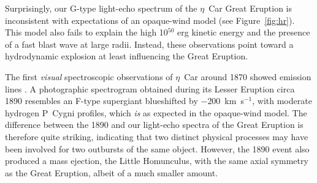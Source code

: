 Surprisingly, our G-type light-echo spectrum of the $\eta$~Car Great
Eruption is inconsistent with expectations of an opaque-wind
model\cite{Davidson87} (see Figure~\ref{fig:hr}). This model also
fails to explain the high 10$^{50}$ erg kinetic energy\cite{Smith03}
and the presence of a fast blast wave at large radii\cite{Smith08}.
Instead, these observations point toward a hydrodynamic explosion 
at least influencing the Great Eruption\cite{Damineli96,Smith03,Smith08}.


The first {\it visual} spectroscopic observations of $\eta$~Car around
1870 showed emission lines \cite{LeSueur70a,LeSueur70b}.  A
photographic spectrogram obtained during its Lesser Eruption circa
1890\cite{Walborn77,Humphreys08} resembles an F-type supergiant
blueshifted by $-$200~km~s$^{-1}$, with moderate hydrogen P~Cygni
profiles, which {\it is} as expected in the opaque-wind
model\cite{Davidson87}.  The difference between the 1890 and our
light-echo spectra of the Great Eruption is therefore quite striking,
indicating that two distinct physical processes may have been involved
for two outbursts of the same object.  However, the 1890 event also
produced a mass ejection, the Little Homunculus, with the same axial
symmetry as the Great Eruption\cite{Smith05}, albeit of a much smaller
amount.

